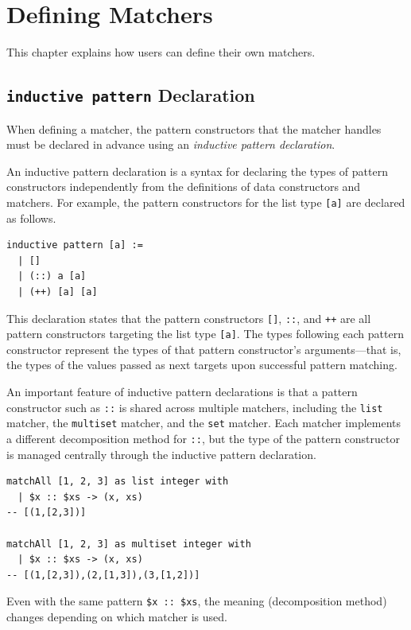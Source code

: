 \chapter{Defining Matchers}\label{matcher}

This chapter explains how users can define their own matchers.

\section{\texttt{inductive pattern} Declaration}\label{matcher-inductive}

When defining a matcher, the pattern constructors that the matcher handles must be declared in advance using an \emph{inductive pattern declaration}.

An inductive pattern declaration is a syntax for declaring the types of pattern constructors independently from the definitions of data constructors and matchers.
For example, the pattern constructors for the list type \lstinline{[a]} are declared as follows.
\begin{lstlisting}[language=egison]
inductive pattern [a] :=
  | []
  | (::) a [a]
  | (++) [a] [a]
\end{lstlisting}
This declaration states that the pattern constructors \lstinline{[]}, \lstinline{::}, and \lstinline{++} are all pattern constructors targeting the list type \lstinline{[a]}.
The types following each pattern constructor represent the types of that pattern constructor's arguments---that is, the types of the values passed as next targets upon successful pattern matching.

An important feature of inductive pattern declarations is that a pattern constructor such as \lstinline{::} is shared across multiple matchers, including the \lstinline{list} matcher, the \lstinline{multiset} matcher, and the \lstinline{set} matcher. Each matcher implements a different decomposition method for \lstinline{::}, but the type of the pattern constructor is managed centrally through the inductive pattern declaration.
\begin{lstlisting}[language=egison,numbers=none]
matchAll [1, 2, 3] as list integer with
  | $x :: $xs -> (x, xs)
-- [(1,[2,3])]

matchAll [1, 2, 3] as multiset integer with
  | $x :: $xs -> (x, xs)
-- [(1,[2,3]),(2,[1,3]),(3,[1,2])]
\end{lstlisting}
Even with the same pattern \lstinline{$x :: $xs}, the meaning (decomposition method) changes depending on which matcher is used.

